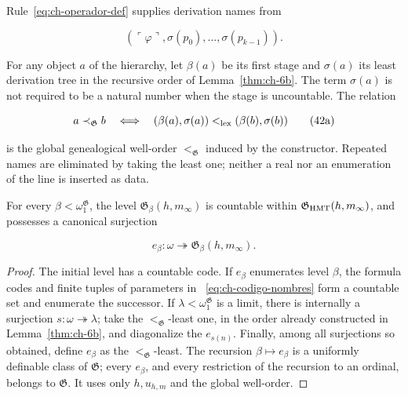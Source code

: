 Rule~\eqref{eq:ch-operador-def} supplies derivation names from

\[
 (\ulcorner\varphi\urcorner,
  \sigma(p_0),\ldots,\sigma(p_{k-1})).
\tag{42}\label{eq:ch-codigo-nombres}
\]

For any object \(a\) of the hierarchy, let \(\beta(a)\) be its first stage and
\(\sigma(a)\) its least derivation tree in the recursive order of
Lemma~\ref{thm:ch-6b}. The term \(\sigma(a)\) is not required to be a natural
number when the stage is uncountable. The relation

\[
 a\prec_{\mathfrak G}b
 \quad\Longleftrightarrow\quad
 (\beta(a),\sigma(a))<_{\rm lex}
 (\beta(b),\sigma(b))
\tag{42a}\label{eq:ch-orden-genealogico}
\]

is the global genealogical well-order \(<_{\mathfrak G}\) induced by the
constructor. Repeated names are eliminated by taking the least one; neither a
real nor an enumeration of the line is inserted as data.

\begin{lemma}
\label{thm:ch-7}
For every \(\beta<\omega_1^{\mathfrak G}\), the level
\(\mathfrak G_\beta(h,m_\infty)\) is countable within
\(\mathfrak G_{\rm HMT}(h,m_\infty)\), and possesses a canonical surjection

\[
 e_\beta:\omega\twoheadrightarrow
 \mathfrak G_\beta(h,m_\infty).
\tag{43}\label{eq:ch-enumeracion-niveles}
\]

\end{lemma}
\begin{proof}
The initial level has a countable code. If \(e_\beta\) enumerates level
\(\beta\), the formula codes and finite tuples of parameters in
~\eqref{eq:ch-codigo-nombres} form a countable set and enumerate the successor.
If \(\lambda<\omega_1^{\mathfrak G}\) is a limit, there is internally a
surjection \(s:\omega\twoheadrightarrow\lambda\); take the
\(<_{\mathfrak G}\)-least one, in the order already constructed in
Lemma~\ref{thm:ch-6b}, and diagonalize the \(e_{s(n)}\). Finally, among all
surjections so obtained, define \(e_\beta\) as the
\(<_{\mathfrak G}\)-least. The recursion \(\beta\mapsto e_\beta\) is a
uniformly definable class of \(\mathfrak G\); every \(e_\beta\), and every
restriction of the recursion to an ordinal, belongs to \(\mathfrak G\). It
uses only \(h,u_{h,m}\) and the global well-order.
\end{proof}

